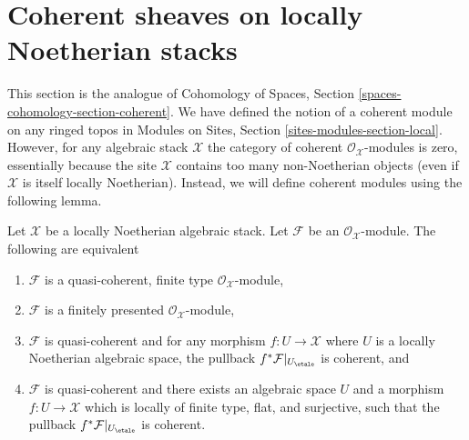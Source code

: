 \section{Coherent sheaves on locally Noetherian stacks}
\label{section-coherent-sheaves}

\noindent
This section is the analogue of
Cohomology of Spaces, Section
\ref{spaces-cohomology-section-coherent}.
We have defined the notion of a coherent module on any ringed topos in
Modules on Sites, Section \ref{sites-modules-section-local}.
However, for any algebraic stack $\mathcal{X}$ the category of
coherent $\mathcal{O}_\mathcal{X}$-modules is zero, essentially because
the site $\mathcal{X}$ contains too many non-Noetherian objects (even
if $\mathcal{X}$ is itself locally Noetherian). Instead, we will define
coherent modules using the following lemma.

\begin{lemma}
\label{lemma-coherent-Noetherian}
Let $\mathcal{X}$ be a locally Noetherian algebraic stack.
Let $\mathcal{F}$ be an $\mathcal{O}_\mathcal{X}$-module.
The following are equivalent
\begin{enumerate}
\item $\mathcal{F}$ is a quasi-coherent, finite type
$\mathcal{O}_\mathcal{X}$-module,
\item $\mathcal{F}$ is a finitely presented $\mathcal{O}_\mathcal{X}$-module,
\item $\mathcal{F}$ is quasi-coherent and for any morphism
$f : U \to \mathcal{X}$ where $U$ is a locally Noetherian algebraic space,
the pullback $f^*\mathcal{F}|_{U_\etale}$ is coherent, and
\item $\mathcal{F}$ is quasi-coherent and there exists an algebraic space
$U$ and a morphism $f : U \to \mathcal{X}$ which is locally of finite type,
flat, and surjective, such that the pullback $f^*\mathcal{F}|_{U_\etale}$
is coherent.
\end{enumerate}
\end{lemma}

